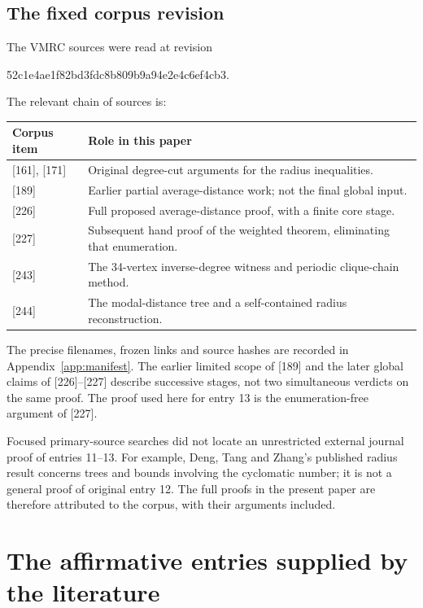 \documentclass[11pt,a4paper]{article}
\theoremstyle{remark}\newtheorem{remark}[theorem]{Remark}
\begin{document}
\subsection{The fixed corpus revision}
The VMRC sources were read at revision
\begin{center}\small\ttfamily
52c1e4ae1f82bd3fdc8b809b9a94e2e4c6ef4cb3.
\end{center}
The relevant chain of sources is:
\begin{center}\small
\begin{tabularx}{\linewidth}{@{}lX@{}}\toprule
Corpus item & Role in this paper\\\midrule
{[161], [171]} & Original degree-cut arguments for the radius inequalities.\\
{[189]} & Earlier partial average-distance work; not the final global input.\\
{[226]} & Full proposed average-distance proof, with a finite core stage.\\
{[227]} & Subsequent hand proof of the weighted theorem, eliminating that enumeration.\\
{[243]} & The 34-vertex inverse-degree witness and periodic clique-chain method.\\
{[244]} & The modal-distance tree and a self-contained radius reconstruction.\\\bottomrule
\end{tabularx}
\end{center}
The precise filenames, frozen links and source hashes are recorded in
Appendix~\ref{app:manifest}. The earlier limited scope of [189] and the later
global claims of [226]--[227] describe successive stages, not two simultaneous
verdicts on the same proof. The proof used here for entry 13 is the
enumeration-free argument of [227].

Focused primary-source searches did not locate an unrestricted external journal
proof of entries 11--13. For example, Deng, Tang and Zhang's published radius
result \cite{deng} concerns trees and bounds involving the cyclomatic number;
it is not a general proof of original entry 12. The full proofs in the present
paper are therefore attributed to the corpus, with their arguments included.

\section{The affirmative entries supplied by the literature}\label{sec:externaltrue}
\end{document}
